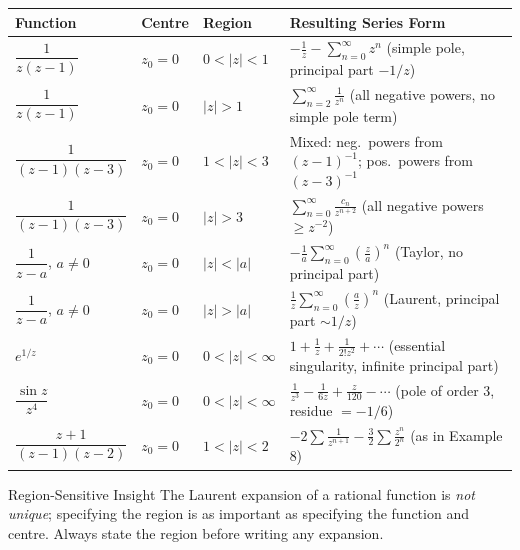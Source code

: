 \documentclass[12pt,a4paper]{article}
\begin{document}
\begin{center}
\begin{tabular}{p{3.2cm} p{1.5cm} p{3.5cm} p{5cm}}
\toprule
\textbf{Function} & \textbf{Centre} & \textbf{Region} & \textbf{Resulting Series Form} \\
\midrule
$\dfrac{1}{z(z-1)}$
  & $z_0=0$
  & $0<|z|<1$
  & $\displaystyle -\frac{1}{z}-\sum_{n=0}^{\infty}z^n$ (simple pole, principal part $-1/z$) \\[14pt]

$\dfrac{1}{z(z-1)}$
  & $z_0=0$
  & $|z|>1$
  & $\displaystyle \sum_{n=2}^{\infty}\frac{1}{z^n}$ (all negative powers, no simple pole term) \\[14pt]

$\dfrac{1}{(z-1)(z-3)}$
  & $z_0=0$
  & $1<|z|<3$
  & Mixed: neg.\ powers from $(z-1)^{-1}$; pos.\ powers from $(z-3)^{-1}$ \\[14pt]

$\dfrac{1}{(z-1)(z-3)}$
  & $z_0=0$
  & $|z|>3$
  & $\displaystyle \sum_{n=0}^{\infty}\frac{c_n}{z^{n+2}}$ (all negative powers $\geq z^{-2}$) \\[14pt]

$\dfrac{1}{z-a}$, $a\neq 0$
  & $z_0=0$
  & $|z|<|a|$
  & $\displaystyle -\frac{1}{a}\sum_{n=0}^{\infty}\left(\frac{z}{a}\right)^n$ (Taylor, no principal part) \\[14pt]

$\dfrac{1}{z-a}$, $a\neq 0$
  & $z_0=0$
  & $|z|>|a|$
  & $\displaystyle \frac{1}{z}\sum_{n=0}^{\infty}\left(\frac{a}{z}\right)^n$ (Laurent, principal part $\sim 1/z$) \\[14pt]

$e^{1/z}$
  & $z_0=0$
  & $0<|z|<\infty$
  & $\displaystyle 1+\frac{1}{z}+\frac{1}{2!z^2}+\cdots$ (essential singularity, infinite principal part) \\[14pt]

$\dfrac{\sin z}{z^4}$
  & $z_0=0$
  & $0<|z|<\infty$
  & $\displaystyle \frac{1}{z^3}-\frac{1}{6z}+\frac{z}{120}-\cdots$ (pole of order 3, residue $= -1/6$) \\[14pt]

$\dfrac{z+1}{(z-1)(z-2)}$
  & $z_0=0$
  & $1<|z|<2$
  & $\displaystyle -2\sum\frac{1}{z^{n+1}} - \frac{3}{2}\sum\frac{z^n}{2^n}$ (as in Example 8) \\
\bottomrule
\end{tabular}
\end{center}

\begin{learnbox}{Region-Sensitive Insight}
The Laurent expansion of a rational function is \emph{not unique}; specifying the region is as
important as specifying the function and centre. Always state the region before writing any
expansion.
\end{learnbox}
\end{document}
